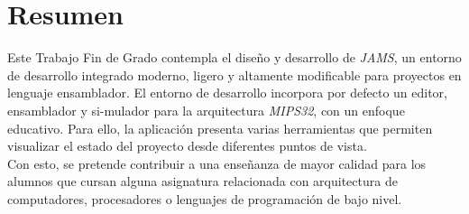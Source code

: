 \chapter{Resumen} \label{ch:resumen}

Este Trabajo Fin de Grado contempla el diseño y desarrollo de \textit{JAMS},
un entorno de desarrollo integrado moderno, ligero y altamente modificable
para proyectos en lenguaje ensamblador.
El entorno de desarrollo incorpora por defecto un editor, ensamblador y si-mulador
para la arquitectura \textit{MIPS32}, con un enfoque educativo.
Para ello, la aplicación presenta varias herramientas que permiten
visualizar el estado del proyecto desde diferentes puntos de vista.\\
Con esto, se pretende contribuir a una enseñanza de mayor calidad para
los alumnos que cursan alguna asignatura relacionada con arquitectura de computadores,
procesadores o lenguajes de programación de bajo nivel.
